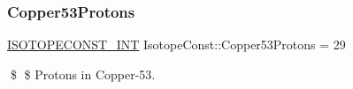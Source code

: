 \subsubsection{\texorpdfstring{Copper53\+Protons}{Copper53Protons}}
{\footnotesize\ttfamily \mbox{\hyperlink{group___isotope_const-_macros_ga5f18360b3e99483a35c32d789e62621c}{I\+S\+O\+T\+O\+P\+E\+C\+O\+N\+S\+T\+\_\+\+I\+NT}} Isotope\+Const\+::\+Copper53\+Protons = 29}

\$ \$ Protons in Copper-\/53. 